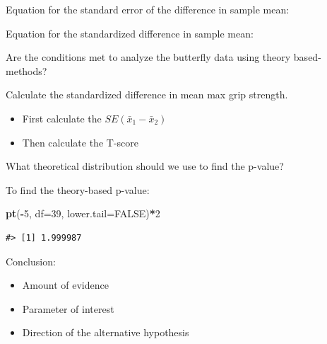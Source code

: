 \documentclass[
]{report}
\newenvironment{Shaded}{\begin{snugshade}}{\end{snugshade}}
\newcommand{\AttributeTok}[1]{\textcolor[rgb]{0.13,0.29,0.53}{#1}}
\newcommand{\ConstantTok}[1]{\textcolor[rgb]{0.56,0.35,0.01}{#1}}
\newcommand{\DecValTok}[1]{\textcolor[rgb]{0.00,0.00,0.81}{#1}}
\newcommand{\FunctionTok}[1]{\textcolor[rgb]{0.13,0.29,0.53}{\textbf{#1}}}
\newcommand{\NormalTok}[1]{#1}
\newcommand{\SpecialCharTok}[1]{\textcolor[rgb]{0.81,0.36,0.00}{\textbf{#1}}}
\providecommand{\tightlist}{%
  \setlength{\itemsep}{0pt}\setlength{\parskip}{0pt}}
\begin{document}
Equation for the standard error of the difference in sample mean:

\vspace{0.5in}

Equation for the standardized difference in sample mean:

\vspace{0.5in}

Are the conditions met to analyze the butterfly data using theory based-methods?

\vspace{0.8in}

Calculate the standardized difference in mean max grip strength.

\begin{itemize}
\tightlist
\item
  First calculate the \(SE(\bar{x}_1 - \bar{x}_2)\)
\end{itemize}

\vspace{0.6in}

\begin{itemize}
\tightlist
\item
  Then calculate the T-score
\end{itemize}

\vspace{1in}

What theoretical distribution should we use to find the p-value?

\vspace{0.3in}

To find the theory-based p-value:

\begin{Shaded}
\begin{Highlighting}[]
\FunctionTok{pt}\NormalTok{(}\SpecialCharTok{{-}}\DecValTok{5}\NormalTok{, }\AttributeTok{df=}\DecValTok{39}\NormalTok{, }\AttributeTok{lower.tail=}\ConstantTok{FALSE}\NormalTok{)}\SpecialCharTok{*}\DecValTok{2}
\end{Highlighting}
\end{Shaded}

\begin{verbatim}
#> [1] 1.999987
\end{verbatim}

Conclusion:

\begin{itemize}
\item
  Amount of evidence
\item
  Parameter of interest
\item
  Direction of the alternative hypothesis
\end{itemize}
\end{document}
